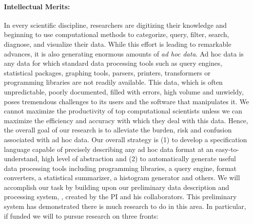 
\paragraph*{Intellectual Merits:} 
In every scientific discipline, researchers are digitizing their knowledge and
beginning to use computational methods to categorize,
query, filter, search, diagnose, and visualize their data.  
While this effort is leading to remarkable advances,
it is also generating enormous amounts of {\em ad hoc data}.
Ad hoc data is any data for which standard data processing tools
such as query engines, statistical packages, graphing tools, parsers, printers,
transformers or programming libraries are not readily available.
This data, which is often unpredictable, poorly documented,
filled with errors, high volume and unwieldy,
poses tremendous challenges to its users and the software
that manipulates it.  We cannot maximize the productivity of top 
computational scientists unless we can maximize the efficiency and 
accuracy with which they deal with this data.  Hence, the overall goal of
our research is to alleviate the burden, risk and confusion
associated with ad hoc data.  Our overall strategy is (1) to develop a
specification language capable of precisely describing any ad hoc data
format at an easy-to-understand, high level of abstraction and (2) to
automatically generate useful data processing tools including
programming libraries, a query engine, format converters, a
statistical summarizer, a histogram generator and others.
We will accomplish our task by building upon our preliminary data
description and processing system, \pads{}, created by the PI and his
collaborators.  This preliminary system has demonstrated
there is much research to do in this area.  In particular, if funded we 
will to pursue research on three fronts:

